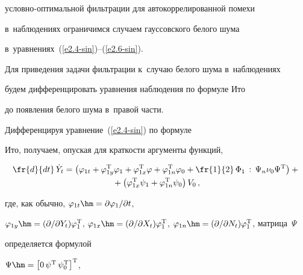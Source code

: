  условно-оп\-ти\-маль\-ной фильтрации  для автокоррелированной помехи 


 в~наблюдениях ограничимся случаем гауссовского белого шума 


 в~уравнениях~(\ref{e2.4-sin})--(\ref{e2.6-sin}).


Для приведения задачи фильтрации к~случаю белого шума в~наблюдениях 


будем дифференцировать уравнения наблюдения по формуле Ито~\cite{2-sin} 


до появления белого шума в~правой части.





Дифференцируя уравнение~(\ref{e2.4-sin}) по формуле


Ито, получаем, опуская для краткости аргументы функций,





\vspace*{-3pt}





\noindent


 \begin{multline*}


 \fr{d}{dt}\,\dot Y_t =\left( \varphi_{1t} + \varphi_{1y}^{\mathrm{T}} \varphi_{1} 


 +\varphi_{1x}^{\mathrm{T}} \varphi +\varphi_{1n}^{\mathrm{T}}\varphi_{0}+


    \fr{1}{2}\,\Phi_1\,:\, \Psi_n \nu_0 \Psi^{\mathrm{T}}  \right)  +{}\\[-1pt]


{}+\left(\varphi_{1x}^{\mathrm{T}}\psi_1 + \varphi_{1n}^{\mathrm{T}} \psi_0\right)V_0\,,




\end{multline*}


где, как обычно,  $\varphi_{1t} \hm=\partial \varphi_{1}/\partial t$,


$\varphi_{1y} \hm=(\partial/\partial Y_t)\varphi_1^{\mathrm{T}}$, $\varphi_{1x}


\hm=(\partial/\partial X_t)\varphi_1^{\mathrm{T}}$, $\varphi_{1n} 


\hm=(\partial/\partial N_t)\varphi_1^{\mathrm{T}}$, матрица~$\Psi$ 


определяется формулой


$\Psi\hm= \left[0\,\psi^{\mathrm{T}}\, \psi_0^{\mathrm{T}}\right]^{\mathrm{T}}$, 


